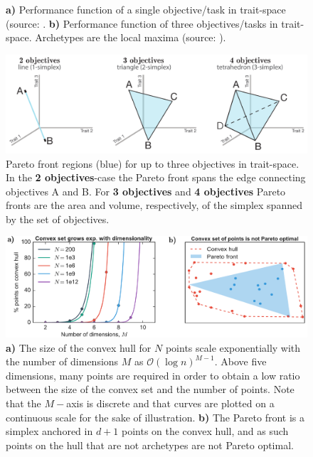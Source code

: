 \begin{figure}
\begin{minipage}[r]{0.40\textwidth}
	\end{minipage}
	\caption{\label{fig:objectivePerformance} \textbf{a)} Performance function of a single objective/task in trait-space (source: \cite{sheftel2013geometry}. \textbf{b)} Performance function of three objectives/tasks in trait-space. Archetypes are the local maxima (source: \cite{szekely2015mass}).}
\end{figure}

\begin{figure}[h]
\centering
\includegraphics[width=\linewidth]{figures/paretoFronts} 
\caption{\label{fig:paretoFront} Pareto front regions (blue) for up to three objectives in trait-space. In the \textbf{2 objectives}-case the Pareto front spans the edge connecting objectives A and B. For \textbf{3 objectives} and \textbf{4 objectives} Pareto fronts are the area and volume, respectively, of the simplex spanned by the set of objectives.}
\end{figure}

\begin{figure}
	\centering
	\includegraphics[width=1\textwidth]{figures/convexHullCurseOfDimensionality}
	\caption{\label{fig:convexHullCurseOfDimensionality} \textbf{a)} The size of the convex hull for $N$ points scale exponentially with the number of dimensions $M$ as $\mathcal{O}(\log{}n)^{M-1}$. Above five dimensions, many points are required in order to obtain a low ratio between the size of the convex set and the number of points. Note that the $M-$axis is discrete and that curves are plotted on a continuous scale for the sake of illustration. \textbf{b)} The Pareto front is a simplex anchored in $d+1$ points on the convex hull, and as such points on the hull that are not archetypes are not Pareto optimal.}
\end{figure}

